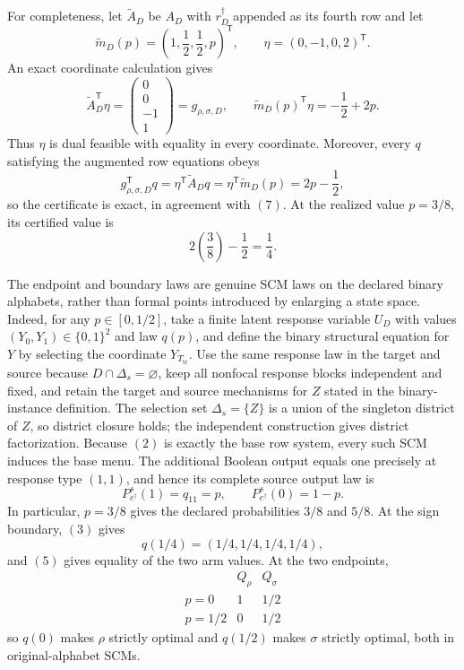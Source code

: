 For completeness, let \(\widetilde A_D\) be \(A_D\) with \(r_D^\dagger\) appended as its fourth row and let
\[
\widetilde m_D(p)=\left(1,\frac12,\frac12,p\right)^{\mathsf T},
\qquad
\eta=(0,-1,0,2)^{\mathsf T}.
\]
An exact coordinate calculation gives
\[
\widetilde A_D^{\mathsf T}\eta
=\begin{pmatrix}0\\0\\-1\\1\end{pmatrix}
=g_{\rho,\sigma,D},
\qquad
\widetilde m_D(p)^{\mathsf T}\eta
=-\frac12+2p.
\tag{9}
\]
Thus \(\eta\) is dual feasible with equality in every coordinate.  Moreover, every \(q\) satisfying the augmented row equations obeys
\[
g_{\rho,\sigma,D}^{\mathsf T}q
=\eta^{\mathsf T}\widetilde A_Dq
=\eta^{\mathsf T}\widetilde m_D(p)
=2p-\frac12,
\]
so the certificate is exact, in agreement with \((7)\).  At the realized value \(p=3/8\), its certified value is
\[
2\left(\frac38\right)-\frac12=\frac14.
\tag{10}
\]

The endpoint and boundary laws are genuine SCM laws on the declared binary alphabets, rather than formal points introduced by enlarging a state space.  Indeed, for any \(p\in[0,1/2]\), take a finite latent response variable \(U_D\) with values \((Y_0,Y_1)\in\{0,1\}^2\) and law \(q(p)\), and define the binary structural equation for \(Y\) by selecting the coordinate \(Y_{T_{\mathrm{tr}}}\).  Use the same response law in the target and source because \(D\cap\Delta_s=\varnothing\), keep all nonfocal response blocks independent and fixed, and retain the target and source mechanisms for \(Z\) stated in the binary-instance definition.  The selection set \(\Delta_s=\{Z\}\) is a union of the singleton district of \(Z\), so district closure holds; the independent construction gives district factorization.  Because \((2)\) is exactly the base row system, every such SCM induces the base menu.  The additional Boolean output equals one precisely at response type \((1,1)\), and hence its complete source output law is
\[
P_{e^\dagger}^s(1)=q_{11}=p,
\qquad
P_{e^\dagger}^s(0)=1-p.
\tag{11}
\]
In particular, \(p=3/8\) gives the declared probabilities \(3/8\) and \(5/8\).  At the sign boundary, \((3)\) gives
\[
q(1/4)=(1/4,1/4,1/4,1/4),
\]
and \((5)\) gives equality of the two arm values.  At the two endpoints,
\[
\begin{array}{c|cc}
&Q_\rho&Q_\sigma\\ \hline
p=0&1&1/2\\
p=1/2&0&1/2
\end{array}
\tag{12}
\]
so \(q(0)\) makes \(\rho\) strictly optimal and \(q(1/2)\) makes \(\sigma\) strictly optimal, both in original-alphabet SCMs.

